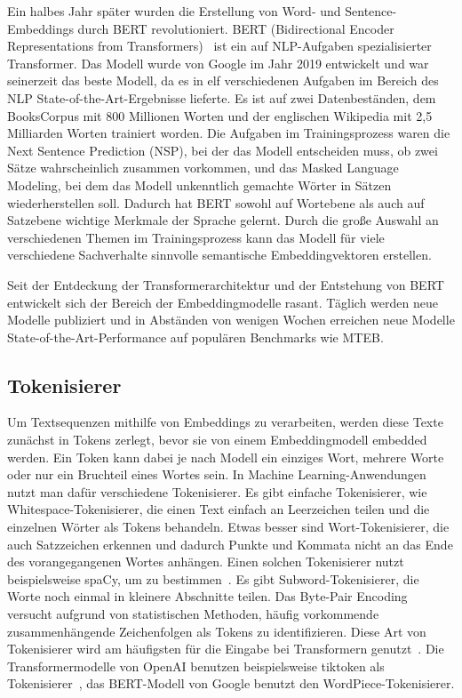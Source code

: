 Ein halbes Jahr später wurden die Erstellung von Word- und Sentence-Embeddings durch BERT revolutioniert.
BERT (Bidirectional Encoder Representations from Transformers)~\cite{devlin2019} ist ein auf NLP-Aufgaben spezialisierter Transformer.
Das Modell wurde von Google im Jahr 2019 entwickelt und war seinerzeit das beste Modell, da es in elf verschiedenen Aufgaben im Bereich des NLP State-of-the-Art-Ergebnisse lieferte.
Es ist auf zwei Datenbeständen, dem BooksCorpus mit 800 Millionen Worten und der englischen Wikipedia mit 2,5 Milliarden Worten trainiert worden.
Die Aufgaben im Trainingsprozess waren die Next Sentence Prediction (NSP), bei der das Modell entscheiden muss, ob zwei Sätze wahrscheinlich zusammen vorkommen, und das Masked Language Modeling, bei dem das Modell unkenntlich gemachte Wörter in Sätzen wiederherstellen soll.
Dadurch hat BERT sowohl auf Wortebene als auch auf Satzebene wichtige Merkmale der Sprache gelernt.
Durch die große Auswahl an verschiedenen Themen im Trainingsprozess kann das Modell für viele verschiedene Sachverhalte sinnvolle semantische Embeddingvektoren erstellen.

Seit der Entdeckung der Transformerarchitektur und der Entstehung von BERT entwickelt sich der Bereich der Embeddingmodelle rasant.
Täglich werden neue Modelle publiziert und in Abständen von wenigen Wochen erreichen neue Modelle State-of-the-Art-Performance auf populären Benchmarks wie MTEB.

\subsection{Tokenisierer}

Um Textsequenzen mithilfe von Embeddings zu verarbeiten, werden diese Texte zunächst in Tokens zerlegt, bevor sie von einem Embeddingmodell embedded werden.
Ein Token kann dabei je nach Modell ein einziges Wort, mehrere Worte oder nur ein Bruchteil eines Wortes sein.
In Machine Learning-Anwendungen nutzt man dafür verschiedene Tokenisierer.
Es gibt einfache Tokenisierer, wie Whitespace-Tokenisierer, die einen Text einfach an Leerzeichen teilen und die einzelnen Wörter als Tokens behandeln.
Etwas besser sind Wort-Tokenisierer, die auch Satzzeichen erkennen und dadurch Punkte und Kommata nicht an das Ende des vorangegangenen Wortes anhängen.
Einen solchen Tokenisierer nutzt beispielsweise spaCy, um  zu bestimmen~\cite{honnibal2017}.
Es gibt Subword-Tokenisierer, die Worte noch einmal in kleinere Abschnitte teilen.
Das Byte-Pair Encoding versucht aufgrund von statistischen Methoden, häufig vorkommende zusammenhängende Zeichenfolgen als Tokens zu identifizieren.
Diese Art von Tokenisierer wird am häufigsten für die Eingabe bei Transformern genutzt~\cite{zouhar2023}.
Die Transformermodelle von OpenAI benutzen beispielsweise tiktoken als Tokenisierer~\cite{tiktoken2024}, das BERT-Modell von Google benutzt den WordPiece-Tokenisierer.

